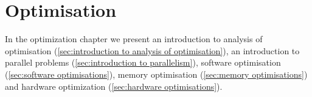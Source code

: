 \chapter{Optimisation}
\label{chap:optimisation}
In the optimization chapter we present an introduction to analysis of optimisation (\cref{sec:introduction to analysis of optimisation}), an introduction to parallel problems (\cref{sec:introduction to parallelism}), software optimisation (\cref{sec:software optimisations}), memory optimisation (\cref{sec:memory optimisations}) and hardware optimization (\cref{sec:hardware optimisations}).





